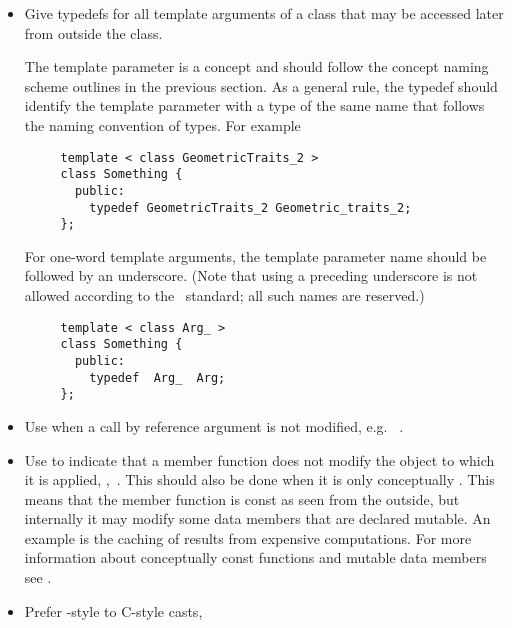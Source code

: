 \begin{itemize}
\item Give typedefs for all template arguments of a class that may be
      accessed later from outside the class.

     The template parameter is a concept and should follow the concept naming
     scheme outlines in the previous section.  As a general rule, the typedef
     should identify the template parameter with a type of the same name that
     follows the naming convention of types.  For example
     \begin{verbatim}
     template < class GeometricTraits_2 >
     class Something {
       public:
         typedef GeometricTraits_2 Geometric_traits_2;
     };
     \end{verbatim}
     For one-word template arguments, the template parameter name should be
     followed by an underscore.  (Note that using a preceding
     underscore is not allowed according to the \CC\ standard; all such names
     are reserved.)%
     \begin{verbatim}
     template < class Arg_ >
     class Something {
       public:
         typedef  Arg_  Arg;
     };
     \end{verbatim}
\item Use  when a call by reference argument is not
      modified, e.g.~%
     .
\item Use  to indicate that a member function does not
      modify the object to which it is applied,
      \eg,~. This should also be
      done when it is only conceptually %
      .
      This means that the member function  is {\ccFont const} as seen from
      the outside, but internally it may modify some data members
      that are declared {\ccFont mutable}. An example
      is the caching of results from expensive computations.  For more
      information about conceptually {\ccFont const} functions and mutable data
      members see \cite{cgal:m-ec-97}.
\item Prefer \CC-style to C-style casts,%

\end{itemize}
